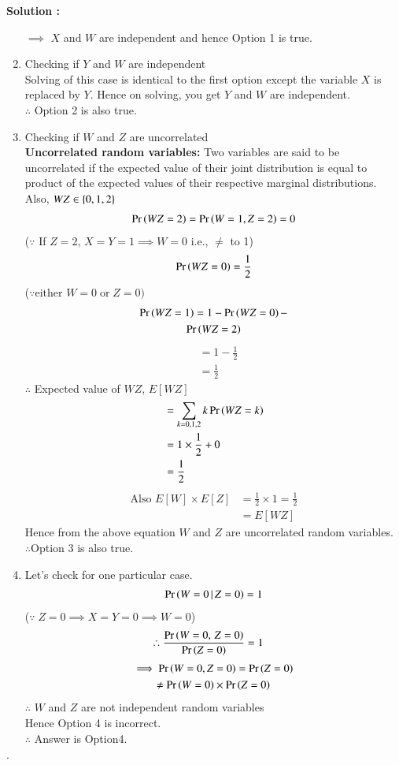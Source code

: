 \documentclass[journal,12pt,twocolumn]{IEEEtran}
\newenvironment{Proof}[2] {\textbf{Solution : }}{\hfill$\cdot$}
\begin{document}
\begin{Proof}{}{}
\begin{enumerate}
$\implies$ $X$ and $W$ are independent and hence Option 1 is true.
\item Checking if $Y$ and $W$ are independent\\
Solving of this case is identical to the first option except the variable $X$ is replaced by $Y$.
Hence on solving, you get $Y$  and $W$ are independent.\\
$\therefore$ Option 2 is also true.
\item Checking if $W$ and $Z$ are uncorrelated\\
\textbf{Uncorrelated random variables:} Two variables are said to be uncorrelated if the expected value of their joint distribution is equal to product of the expected values of their respective marginal distributions.\\
Also, $WZ \in\left\{0,1,2\right\}$
\begin{align}
    \Pr\left(WZ =2\right) = \Pr\left(W=1,Z=2\right) =0
\end{align}
($\because$ If $Z=2$, $X = Y =1 \implies W =0$ i.e., $\neq$ to 1)
\begin{align}
    \Pr\left(WZ =0\right) = \frac{1}{2}
\end{align}
($\because\text{either }W=0\;\text{or}\;Z =0)$
\begin{multline}
    \Pr\left(WZ=1\right) = 1 - \Pr\left(WZ =0\right) - \\\Pr\left(WZ =2\right)
\end{multline}
\begin{align}
    &= 1 -\frac{1}{2}\\
    &= \frac{1}{2}
\end{align}
$\therefore$ Expected value of $WZ$, $E[WZ]$
\begin{align}
    &= \sum_{k=0,1,2} k\Pr\left(WZ =k\right)\\
    &= 1 \times \frac{1}{2} +0\\
    &= \frac{1}{2}
\end{align}
\begin{align}
    \text{Also } E[W]\times E[Z] &= \frac{1}{2}\times1 = \frac{1}{2}\\
                                 &= E[WZ]
\end{align}
Hence from the above equation $W$ and $Z$ are uncorrelated random variables.\\
$\therefore$Option 3 is also true.
\item Let's check for one particular case.
\begin{align}
    \Pr\left(W=0\,|\,Z=0\right) = 1
\end{align}
($\because\;Z=0 \implies X = Y =0 \implies W=0$)
\begin{align}
    \therefore \frac{\Pr\left(W=0,\,Z=0\right)}{\Pr\left(Z=0\right)} &= 1
\end{align}
\begin{multline}
   \implies\Pr\left(W=0,Z=0\right) =\Pr\left(Z=0\right) \\
                       \neq\Pr\left(W=0\right)\times\Pr\left(Z=0\right)   
\end{multline}
$\therefore$ $W$ and $Z$ are not independent random variables\\
Hence Option 4 is incorrect.\\
$\therefore$ Answer is Option4.
    

\end{enumerate}
\end{Proof}
\end{document}
